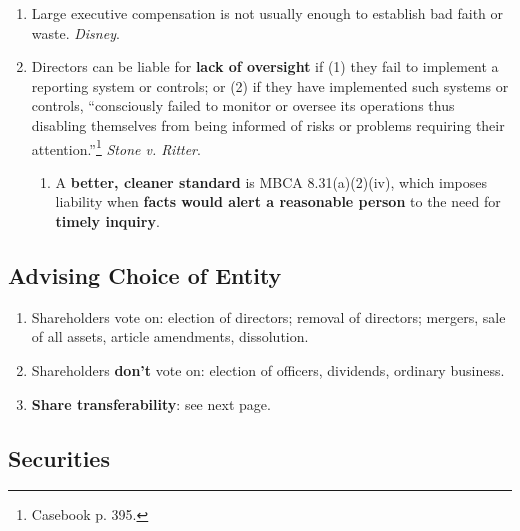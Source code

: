 \begin{enumerate}
\begin{enumerate}
        \item Large executive compensation is not usually enough to establish 
        bad faith or waste. \emph{Disney}.
        \item Directors can be liable for \textbf{lack of oversight} if (1) 
        they fail to implement a reporting system or controls; or (2) if they 
        have implemented such systems or controls, ``consciously failed to 
        monitor or oversee its operations thus disabling themselves from being 
        informed of risks or problems requiring their 
        attention.''\footnote{Casebook p. 395.} \emph{Stone v. Ritter}.
        \begin{enumerate}
            \item A \textbf{better, cleaner standard} is MBCA 8.31(a)(2)(iv), 
            which imposes liability when \textbf{facts would alert a 
            reasonable person} to the need for \textbf{timely inquiry}.
        \end{enumerate}
    \end{enumerate}
\end{enumerate}



\newpage

\subsection{Advising Choice of Entity}

\begin{enumerate}
    \item Shareholders vote on: election of directors; removal of directors; 
    mergers, sale of all assets, article amendments, dissolution.
    \item Shareholders \textbf{don't} vote on: election of officers, 
    dividends, ordinary business.
    \item \textbf{Share transferability}: see next page.
\end{enumerate}




\newpage

\subsection{Securities}

